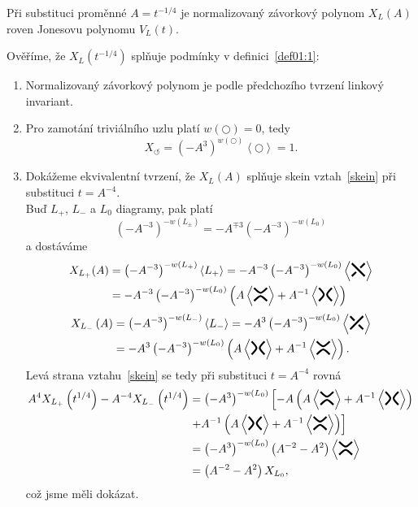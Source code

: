 \begin{tvrz}\label{t01:6}
Při substituci proměnné $A = t^{-1/4}$ je normalizovaný závorkový polynom $X_L(A)$  roven Jonesovu polynomu $V_L(t)$.
\end{tvrz}
\begin{dukaz}
Ověříme, že $X_L\left(t^{-1/4}\right)$ splňuje podmínky v definici~\ref{def01:1}:

\begin{enumerate}
\item
Normalizovaný závorkový polynom je podle předchozího tvrzení linkový invariant.
\item
Pro zamotání triviálního uzlu platí $w\left( \pmb{\bigcirc}\right) = 0$, tedy $$X_{\pmb{\circlearrowleft}} = \left(-A^3\right)^{w( \pmb{\bigcirc})} \left\langle \pmb{\bigcirc} \right\rangle = 1.$$ 
\item
Dokážeme ekvivalentní tvrzení, že $X_L(A)$ splňuje skein vztah~\ref{skein} při substituci $t=A^{-4}$. \\ 
Buď $L_+$, $ L_-$ a $L_0$ diagramy, pak platí $$\left(-A^{-3}\right)^{-w(L_{\pm})} = -A^{\mp 3} \left(-A^{-3}\right)^{-w(L_0)}$$ a dostáváme
\begin{equation*}
\begin{split}
X_{L_+}(A) & = \left(-A^{-3}\right)^{-w(L_+)} \left\langle L_+  \right\rangle = -A^{-3} \left(-A^{-3}\right)^{-w(L_0)}  \left\langle \minuskriz   \right\rangle \\ & = -A^{-3} \left(-A^{-3}\right)^{-w(L_0)} \left(A \left\langle \horkriz  \right\rangle + A^{-1}  \left\langle \vertkriz  \right\rangle\right)
\end{split}
\end{equation*}
\begin{equation*}
\begin{split}
X_{L_-}\left(A\right) & =\left(-A^{-3}\right)^{-w(L_-)} \left\langle L_-  \right\rangle = -A^{3}\left(-A^{-3}\right)^{-w(L_0)} \left\langle \pluskriz   \right\rangle \\ & = -A^{3} \left(-A^{-3}\right)^{-w(L_0)} \left(A \left\langle \vertkriz  \right\rangle + A^{-1}  \left\langle \horkriz  \right\rangle\right) .
\end{split}
\end{equation*}
Levá strana vztahu~\ref{skein} se tedy při substituci $t=A^{-4}$ rovná
\begin{equation*}
\begin{split}
A^4 X_{L_+}\left(t^{1/4}\right)  - A^{-4} X_{L_-} \left(t^{1/4}\right) &  =  \left(-A^3\right)^{-w(L_0)} \left[ -A  \left(A \left\langle \horkriz \right\rangle + A^{-1}  \left\langle \vertkriz \right\rangle \right) \right. \\ & \left. + A^{-1} \left(A \left\langle \vertkriz \right\rangle + A^{-1}  \left\langle \horkriz \right\rangle\right) \right] \\ & = \left(-A^3\right)^{-w(L_0)} \left(A^{-2} -A^2\right) \left\langle \horkriz \right\rangle \\ & =  \left(A^{-2} -A^2\right) X_{L_0},
\end{split}
\end{equation*}
což jsme měli dokázat.
\end{enumerate}
$ $
\end{dukaz}
